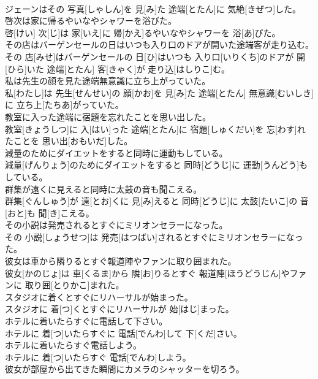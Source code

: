 \documentclass[8pt]{extreport}
\begin{document}
\begin{CJK}{UTF8}{min}
\\	ジェーンはその 写真[しゃしん]を 見[み]た 途端[とたん]に 気絶[きぜつ]した。
\\	啓次は家に帰るやいなやシャワーを浴びた。	
\\	啓[けい] 次[じ]は 家[いえ]に 帰[かえ]るやいなやシャワーを 浴[あ]びた。
\\	その店はバーゲンセールの日はいつも入り口のドアが開いた途端客が走り込む。	
\\	その 店[みせ]はバーゲンセールの 日[ひ]はいつも 入り口[いりくち]のドアが 開[ひら]いた 途端[とたん] 客[きゃく]が 走り込[はしりこ]む。
\\	私は先生の顔を見た途端無意識に立ち上がっていた。	
\\	私[わたし]は 先生[せんせい]の 顔[かお]を 見[み]た 途端[とたん] 無意識[むいしき]に 立ち上[たちあ]がっていた。
\\	教室に入った途端に宿題を忘れたことを思い出した。	
\\	教室[きょうしつ]に 入[はい]った 途端[とたん]に 宿題[しゅくだい]を 忘[わす]れたことを 思い出[おもいだ]した。
\\	減量のためにダイエットをすると同時に運動もしている。	
\\	減量[げんりょう]のためにダイエットをすると 同時[どうじ]に 運動[うんどう]もしている。
\\	群集が遠くに見えると同時に太鼓の音も聞こえる。	
\\	群集[ぐんしゅう]が 遠[とお]くに 見[み]えると 同時[どうじ]に 太鼓[たいこ]の 音[おと]も 聞[き]こえる。
\\	その小説は発売されるとすぐにミリオンセラーになった。	
\\	その 小説[しょうせつ]は 発売[はつばい]されるとすぐにミリオンセラーになった。
\\	彼女は車から隣りるとすぐ報道陣やファンに取り囲まれた。	
\\	彼女[かのじょ]は 車[くるま]から 隣[お]りるとすぐ 報道陣[ほうどうじん]やファンに 取り囲[とりかこ]まれた。
\\	スタジオに着くとすぐにリハーサルが始まった。	
\\	スタジオに 着[つ]くとすぐにリハーサルが 始[はじ]まった。
\\	ホテルに着いたらすぐに電話して下さい。	
\\	ホテルに 着[つ]いたらすぐに 電話[でんわ]して 下[くだ]さい。
\\	ホテルに着いたらすぐ電話しよう。	
\\	ホテルに 着[つ]いたらすぐ 電話[でんわ]しよう。
\\	彼女が部屋から出てきた瞬間にカメラのシャッターを切ろう。	

\end{CJK}
\end{document}
